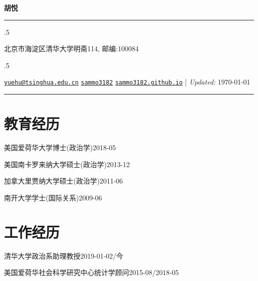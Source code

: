 \documentclass[10.5pt,]{article}
\providecommand{\tightlist}{%
	\setlength{\itemsep}{0pt}\setlength{\parskip}{0pt}}
\renewenvironment{itemize}{
	\begin{list}{}{
			\setlength{\leftmargin}{1.5em}
		}
	}{
	\end{list}
}
\begin{document}
	
	
	\centerline{\huge \bf 胡悦}
	
	
	
	\vspace{2 mm}
	
	\hrule
	
	\vspace{2 mm}
	
	
	\moveleft.5\hoffset\centerline{北京市海淀区清华大学明斋114, 邮编:100084}
	\moveleft.5\hoffset\centerline{ {\FA\faEnvelope} \hspace{1 mm} \href{mailto:}{\tt \href{mailto:yuehu@tsinghua.edu.cn}{\nolinkurl{yuehu@tsinghua.edu.cn}}} \hspace{1 mm}  {\FA\faGithub} \hspace{1 mm} \href{http://github.com/sammo3182}{\tt sammo3182} \hspace{1 mm}    {\FA\faGlobe} \hspace{1 mm} \href{http://sammo3182.github.io}{\tt sammo3182.github.io}    | \emph{Updated:} \today}
	
	\vspace{2 mm}
	
	\hrule
	
		
	\hypertarget{ux6559ux80b2ux7ecfux5386}{%
\section{教育经历}\label{ux6559ux80b2ux7ecfux5386}}

\begin{itemize}
\tightlist
\item
  美国爱荷华大学博士(政治学)\hfill 2018-05
\item
  美国南卡罗来纳大学硕士(政治学)\hfill 2013-12
\item
  加拿大里贾纳大学硕士(政治学)\hfill 2011-06
\item
  南开大学学士(国际关系)\hfill 2009-06
\end{itemize}

\hypertarget{ux5de5ux4f5cux7ecfux5386}{%
\section{工作经历}\label{ux5de5ux4f5cux7ecfux5386}}

\begin{itemize}
\tightlist
\item
  清华大学政治系助理教授\hfill 2019-01-02/今
\item
  美国爱荷华社会科学研究中心统计学顾问\hfill 2015-08/2018-05
\end{itemize}
\end{document}
